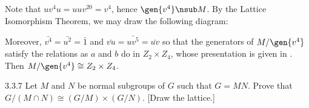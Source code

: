 \begin{sol}
    Note that $uv^4u = uuv^{20} = v^4$, hence $\gen{v^4} \nsub M$.
	By the Lattice Isomorphism Theorem, we may draw the following diagram:
    \begin{center}
    \end{center}
    Moreover, $\bar{v^4} = \bar{u^2} = \bar 1$ and $\bar{vu} = \bar{uv^5} = \bar{uv}$ so that the generators of $M/\gen{v^4}$ satisfy the relations as $a$ and $b$ do in $Z_2 \times Z_4$, whose presentation is given in .
	Then $M/\gen{v^4} \cong Z_2 \times Z_4$.
\end{sol}

\begin{exercise}{3.3.7}
    Let $M$ and $N$ be normal subgroups of $G$ such that $G = MN$.
	Prove that $G/(M \cap N) \cong (G/M) \times (G/N)$. [Draw the lattice.]
\end{exercise}

